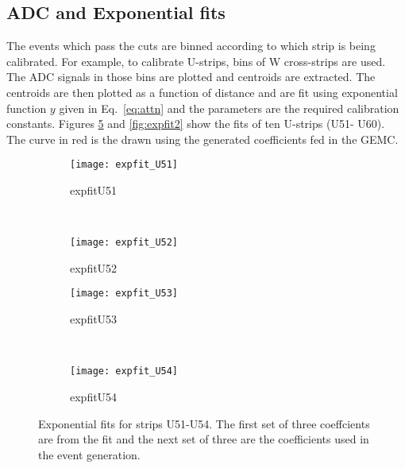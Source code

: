 \subsection{ADC and Exponential fits}
The events which pass the cuts are binned according to which strip is being calibrated. For example, to calibrate U-strips, bins of W
cross-strips are used. The ADC signals in those bins are plotted and centroids are extracted. The centroids are then plotted as a
function of distance and are fit using exponential function $y$ given in Eq.~\ref{eq:attn} and the parameters are the required
calibration constants. Figures \ref{fig:expfit1} and \ref{fig:expfit2} show the fits of ten U-strips (U51- U60). The curve in red
is the drawn using the generated coefficients fed in the GEMC.
\begin{figure}[h]
    \centering
    \begin{subfigure}[h]{0.44\textwidth}
        \centering
        \texttt{[image: expfit\_U51]}
        \caption{expfitU51}
        \label{fig:expfit_U51}
    \end{subfigure}
    ~
    \begin{subfigure}[h]{0.44\textwidth}
        \centering
        \texttt{[image: expfit\_U52]}
        \caption{expfitU52}
        \label{fig:expfit_U52}
    \end{subfigure}
    
    \begin{subfigure}[h]{0.44\textwidth}
        \centering
        \texttt{[image: expfit\_U53]}
        \caption{expfitU53}
        \label{fig:expfit_U53}
    \end{subfigure}
    ~
    \begin{subfigure}[h]{0.44\textwidth}
        \centering
        \texttt{[image: expfit\_U54]}
        \caption{expfitU54}
        \label{fig:expfit_U54}
    \end{subfigure}
    \caption{Exponential fits for strips U51-U54. The first set of three coeffcients are from the fit and the next set of three are
     the coefficients used in the event generation.}
    \label{fig:expfit1}
\end{figure}

